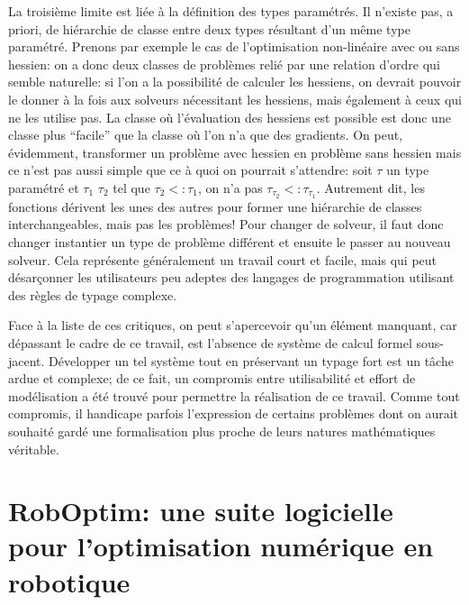 La troisième limite est liée à la définition des types paramétrés. Il
n'existe pas, a priori, de hiérarchie de classe entre deux types
résultant d'un même type paramétré. Prenons par exemple le cas de
l'optimisation non-linéaire avec ou sans hessien: on a donc deux
classes de problèmes relié par une relation d'ordre qui semble
naturelle: si l'on a la possibilité de calculer les hessiens, on
devrait pouvoir le donner à la fois aux solveurs nécessitant les
hessiens, mais également à ceux qui ne les utilise pas. La classe où
l'évaluation des hessiens est possible est donc une classe plus
``facile'' que la classe où l'on n'a que des gradients. On peut,
évidemment, transformer un problème avec hessien en problème sans
hessien mais ce n'est pas aussi simple que ce à quoi on pourrait
s'attendre: soit $\tau$ un type paramétré et $\tau_1$ $\tau_2$ tel que
$\tau_2 <: \tau_1$, on n'a pas $\tau_{\tau_2} <:
\tau_{\tau_1}$. Autrement dit, les fonctions dérivent les unes des
autres pour former une hiérarchie de classes interchangeables, mais
pas les problèmes! Pour changer de solveur, il faut donc changer
instantier un type de problème différent et ensuite le passer au
nouveau solveur. Cela représente généralement un travail court et
facile, mais qui peut désarçonner les utilisateurs peu adeptes des
langages de programmation utilisant des règles de typage complexe.


Face à la liste de ces critiques, on peut s'apercevoir qu'un élément
manquant, car dépassant le cadre de ce travail, est l'absence de
système de calcul formel sous-jacent. Développer un tel système tout
en préservant un typage fort est un tâche ardue et complexe; de ce
fait, un compromis entre utilisabilité et effort de modélisation a été
trouvé pour permettre la réalisation de ce travail. Comme tout
compromis, il handicape parfois l'expression de certains problèmes
dont on aurait souhaité gardé une formalisation plus proche de leurs
natures mathématiques véritable.


\section{RobOptim: une suite logicielle pour l'optimisation numérique en robotique}


